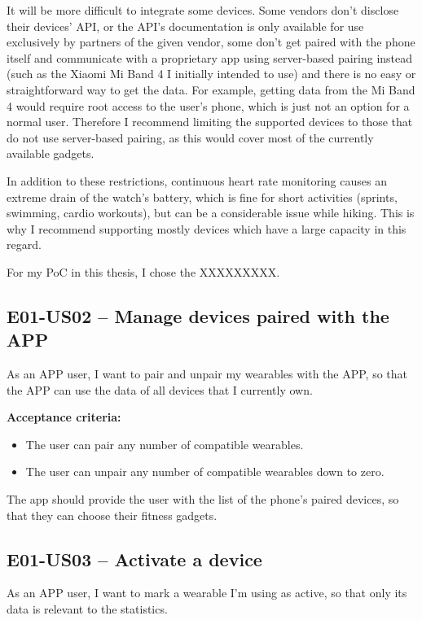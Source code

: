 It will be more difficult to integrate some devices.
Some vendors don't disclose their devices' API, or the API's documentation is only available for use exclusively by partners of the given vendor,
some don't get paired with the phone itself and communicate with a proprietary app using server-based pairing instead (such as the Xiaomi Mi Band 4 I initially intended to use) and there is no easy or straightforward way to get the data.
For example, getting data from the Mi Band 4 would require root access to the user's phone\cite{miband4-server-based}, which is just not an option for a normal user.
Therefore I recommend limiting the supported devices to those that do not use server-based pairing, as this would cover most of the currently available gadgets.

In addition to these restrictions, continuous heart rate monitoring causes an extreme drain of the watch's battery, which is fine for short activities (sprints, swimming, cardio workouts), but can be a considerable issue while hiking.
This is why I recommend supporting mostly devices which have a large capacity in this regard.

For my PoC in this thesis, I chose the XXXXXXXXX.

\subsection*{E01-US02 -- Manage devices paired with the APP}
As an APP user, I want to pair and unpair my wearables with the APP, so that the APP can use the data of all devices that I currently own.

\textbf{Acceptance criteria:}
\begin{itemize}
    \item The user can pair any number of compatible wearables.
    \item The user can unpair any number of compatible wearables down to zero.
\end{itemize}

The app should provide the user with the list of the phone's paired devices, so that they can choose their fitness gadgets.

\subsection*{E01-US03 -- Activate a device}
As an APP user, I want to mark a wearable I'm using as active, so that only its data is relevant to the statistics.

